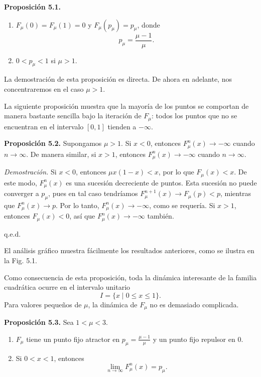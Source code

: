 \documentclass[10pt,a4paper]{book}
\begin{document}
\medskip

\textbf{Proposición 5.1.}
\begin{enumerate}
    \item $F_{\mu}(0)=F_{\mu}(1)=0$ y $F_{\mu}(p_{\mu})=p_{\mu}$, donde 
    \[
    p_{\mu}=\frac{\mu-1}{\mu}.
    \]
    \item $0<p_{\mu}<1$ si $\mu>1$.
\end{enumerate}

La demostración de esta proposición es directa.  
De ahora en adelante, nos concentraremos en el caso $\mu>1$.  

La siguiente proposición muestra que la mayoría de los puntos se comportan de manera bastante sencilla 
bajo la iteración de $F_{\mu}$: todos los puntos que no se encuentran en el intervalo $[0,1]$ tienden a $-\infty$.

\medskip

\textbf{Proposición 5.2.} Supongamos $\mu>1$.  
Si $x<0$, entonces $F_{\mu}^{n}(x)\to -\infty$ cuando $n\to\infty$.  
De manera similar, si $x>1$, entonces $F_{\mu}^{n}(x)\to -\infty$ cuando $n\to\infty$.

\bigskip

\emph{Demostración.}  
Si $x<0$, entonces $\mu x(1-x)<x$, por lo que $F_{\mu}(x)<x$.  
De este modo, $F_{\mu}^{n}(x)$ es una sucesión decreciente de puntos.  
Esta sucesión no puede converger a $p_{\mu}$, pues en tal caso tendríamos 
$F_{\mu}^{n+1}(x)\to F_{\mu}(p)<p$, mientras que $F_{\mu}^{n}(x)\to p$.  
Por lo tanto, $F_{\mu}^{n}(x)\to -\infty$, como se requería. Si $x>1$, entonces $F_{\mu}(x)<0$, así que $F_{\mu}^{n}(x)\to -\infty$ también.  

\hfill q.e.d.

\bigskip

El análisis gráfico muestra fácilmente los resultados anteriores, como se ilustra en la Fig. 5.1.  

Como consecuencia de esta proposición, toda la dinámica interesante de la familia cuadrática ocurre en el intervalo unitario 
\[
I=\{x \;|\; 0 \leq x \leq 1\}.
\]
Para valores pequeños de $\mu$, la dinámica de $F_{\mu}$ no es demasiado complicada.

\newpage

\textbf{Proposición 5.3.} Sea $1<\mu<3$.
\begin{enumerate}
    \item $F_{\mu}$ tiene un punto fijo atractor en $p_{\mu}=\tfrac{\mu-1}{\mu}$ y un punto fijo repulsor en $0$.
    \item Si $0<x<1$, entonces 
    \[
    \lim_{n \to \infty} F_{\mu}^{n}(x)=p_{\mu}.
    \]
\end{enumerate}
\end{document}
